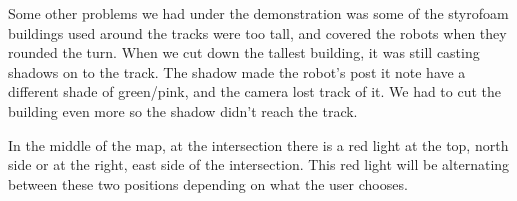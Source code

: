 Some other problems we had under the demonstration was some of the styrofoam buildings used around the tracks were too tall, and covered the robots when they rounded the turn. When we cut down the tallest building, it was still casting shadows on to the track. The shadow made the robot's post it note have a different shade of green/pink, and the camera lost track of it. We had to cut the building even more so the shadow didn't reach the track.

In the middle of the map, at the intersection there is a red light at the top, north side or at the right, east side of the intersection. This red light will be alternating between these two positions depending on what the user chooses. 
\begin{figure}
    \centering
    \hfill
    \hfill
    
            \caption[Demo of project]{}
            \label{fig:demo}
\end{figure}

